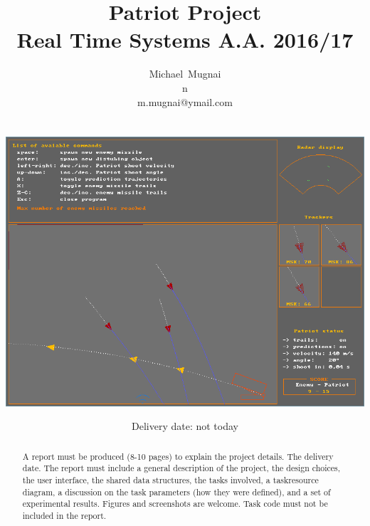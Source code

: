 \documentclass[notitlepage,a4paper,10pt]{article} %
\title{Patriot Project \\
	\large Real Time Systems A.A. 2016/17}
\author{Michael~Mugnai\\n\textdegree 556448\\m.mugnai@ymail.com \\ \\ \\
	\includegraphics[width=\textwidth]{cover.png}}
\date{Delivery date: not today}
\begin{document}
\maketitle

\begin{abstract} %
	A report must be produced (8-10 pages) to explain the project details. The delivery date.
	The report must include a general description of the project, the design choices, the user interface,
	the shared data structures, the tasks involved, a taskresource diagram, a discussion on the task
	parameters (how they were defined), and a set of experimental results. Figures and screenshots are welcome.
	Task code must not be included in the report.
\end{abstract}

\newpage
\hypersetup{linkcolor=black}
\tableofcontents
\hypersetup{linkcolor=blue}
\newpage
\end{document}
